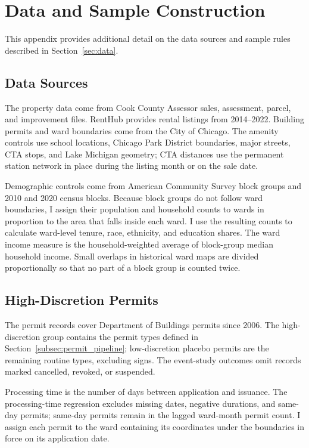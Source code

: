 
\section{Data and Sample Construction}
\label{app:data_sources}
\label{sec:appendix_data}

This appendix provides additional detail on the data sources and sample rules described in Section~\ref{sec:data}.

\subsection{Data Sources}
\label{subsec:appendix_data_sources}

The property data come from Cook County Assessor sales, assessment, parcel, and improvement files.
RentHub provides rental listings from 2014--2022.
Building permits and ward boundaries come from the City of Chicago.
The amenity controls use school locations, Chicago Park District boundaries, major streets, CTA stops, and Lake Michigan geometry; CTA distances use the permanent station network in place during the listing month or on the sale date.

Demographic controls come from American Community Survey block groups and 2010 and 2020 census blocks.
Because block groups do not follow ward boundaries, I assign their population and household counts to wards in proportion to the area that falls inside each ward.
I use the resulting counts to calculate ward-level tenure, race, ethnicity, and education shares.
The ward income measure is the household-weighted average of block-group median household income.
Small overlaps in historical ward maps are divided proportionally so that no part of a block group is counted twice.

\subsection{High-Discretion Permits}
\label{subsec:permits_sample}

The permit records cover Department of Buildings permits since 2006.
The high-discretion group contains the permit types defined in Section~\ref{subsec:permit_pipeline}; low-discretion placebo permits are the remaining routine types, excluding signs.
The event-study outcomes omit records marked cancelled, revoked, or suspended.

Processing time is the number of days between application and issuance.
The processing-time regression excludes missing dates, negative durations, and same-day permits; same-day permits remain in the lagged ward-month permit count.
I assign each permit to the ward containing its coordinates under the boundaries in force on its application date.

